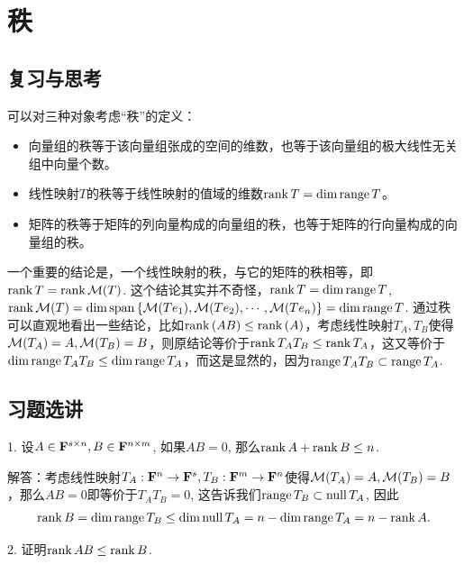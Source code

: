 \documentclass[hyperref,]{ctexart}
\providecommand{\tightlist}{%
  \setlength{\itemsep}{0pt}\setlength{\parskip}{0pt}}
\begin{document}
\section{秩}\label{ux79e9}

\subsection{复习与思考}\label{ux590dux4e60ux4e0eux601dux8003-1}

可以对三种对象考虑``秩''的定义：

\begin{itemize}
\tightlist
\item
  向量组的秩等于该向量组张成的空间的维数，也等于该向量组的极大线性无关组中向量个数。
\item
  线性映射\(T\)的秩等于线性映射的值域的维数\(\mathrm{rank}\, T=\mathrm{dim}\, \mathrm{range}\, T\)。
\item
  矩阵的秩等于矩阵的列向量构成的向量组的秩，也等于矩阵的行向量构成的向量组的秩。
\end{itemize}

一个重要的结论是，一个线性映射的秩，与它的矩阵的秩相等，即\(\mathrm{rank}\, T = \mathrm{rank}\, \mathcal{M}(T)\).
这个结论其实并不奇怪，\(\mathrm{rank}\, T= \mathrm{dim}\, \mathrm{range}\, T\),
\(\mathrm{rank}\,\mathcal{M}(T) = \mathrm{dim}\,\mathrm{span}\,\{\mathcal{M}(Te_1),\mathcal{M}(Te_2),\cdots,\mathcal{M}(Te_n)\} = \mathrm{dim}\, \mathrm{range}\, T\).
通过秩可以直观地看出一些结论，比如\(\mathrm{rank}\,(AB)\le \mathrm{rank}\,(A)\)，考虑线性映射\(T_A,T_B\)使得\(\mathcal{M}(T_A)=A,\mathcal{M}(T_B)=B\)，则原结论等价于\(\mathrm{rank}\, T_AT_B\le \mathrm{rank}\, T_A\)，这又等价于\(\mathrm{dim}\, \mathrm{range}\, T_AT_B\le \mathrm{dim}\,\mathrm{range}\, T_A\)，而这是显然的，因为\(\mathrm{range}\, T_AT_B\subset\mathrm{range}\, T_A\).

\subsection{习题选讲}\label{ux4e60ux9898ux9009ux8bb2-1}

\noindent{} 1. 设\(A\in\mathbf{F}^{s\times n},B\in\mathbf{F}^{n\times m}\),
如果\(AB=0\), 那么\(\mathrm{rank}\, A+\mathrm{rank}\, B\le n\).

\smallskip

\noindent{}
解答：考虑线性映射\(T_A:\mathbf{F}^n \rightarrow\mathbf{F}^s ,T_B:\mathbf{F}^{m}\rightarrow\mathbf{F}^n\)使得\(\mathcal{M}(T_A)=A,\mathcal{M}(T_B)=B\)，那么\(AB = 0\)即等价于\(T_AT_B=0\),
这告诉我们\(\mathrm{range}\, T_B \subset\mathrm{null}\, T_A\), 因此
\[\mathrm{rank}\, B = \mathrm{dim}\, \mathrm{range}\, T_B \le \mathrm{dim}\, \mathrm{null}\, T_A = n - \mathrm{dim}\,\mathrm{range}\, T_A = n-\mathrm{rank}\, A.\]

\bigskip

\noindent{} 2. 证明\(\mathrm{rank}\, AB\le \mathrm{rank}\, B\).

\smallskip
\end{document}
